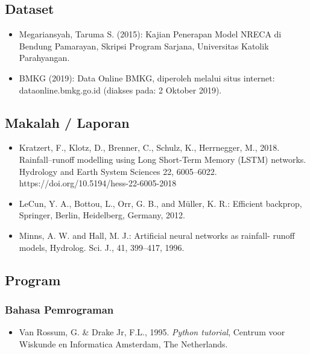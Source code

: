 \documentclass[11pt]{article}
\providecommand{\tightlist}{%
      \setlength{\itemsep}{0pt}\setlength{\parskip}{0pt}}
\begin{document}
    \hypertarget{dataset}{%
\subsection{Dataset}\label{dataset}}

\begin{itemize}
\tightlist
\item
  Megariansyah, Taruma S. (2015): Kajian Penerapan Model NRECA di
  Bendung Pamarayan, Skripsi Program Sarjana, Universitas Katolik
  Parahyangan.
\item
  BMKG (2019): Data Online BMKG, diperoleh melalui situs internet:
  dataonline.bmkg.go.id (diakses pada: 2 Oktober 2019).
\end{itemize}

\hypertarget{makalah-laporan}{%
\subsection{Makalah / Laporan}\label{makalah-laporan}}

\begin{itemize}
\tightlist
\item
  Kratzert, F., Klotz, D., Brenner, C., Schulz, K., Herrnegger, M.,
  2018. Rainfall--runoff modelling using Long Short-Term Memory (LSTM)
  networks. Hydrology and Earth System Sciences 22, 6005--6022.
  https://doi.org/10.5194/hess-22-6005-2018
\item
  LeCun, Y. A., Bottou, L., Orr, G. B., and Müller, K. R.: Efficient
  backprop, Springer, Berlin, Heidelberg, Germany, 2012.
\item
  Minns, A. W. and Hall, M. J.: Artificial neural networks as rainfall-
  runoff models, Hydrolog. Sci. J., 41, 399--417, 1996.
\end{itemize}

\hypertarget{program}{%
\subsection{Program}\label{program}}

\hypertarget{bahasa-pemrograman}{%
\subsubsection{Bahasa Pemrograman}\label{bahasa-pemrograman}}

\begin{itemize}
\tightlist
\item
  Van Rossum, G. \& Drake Jr, F.L., 1995. \emph{Python tutorial},
  Centrum voor Wiskunde en Informatica Amsterdam, The Netherlands.
\end{itemize}
\end{document}
